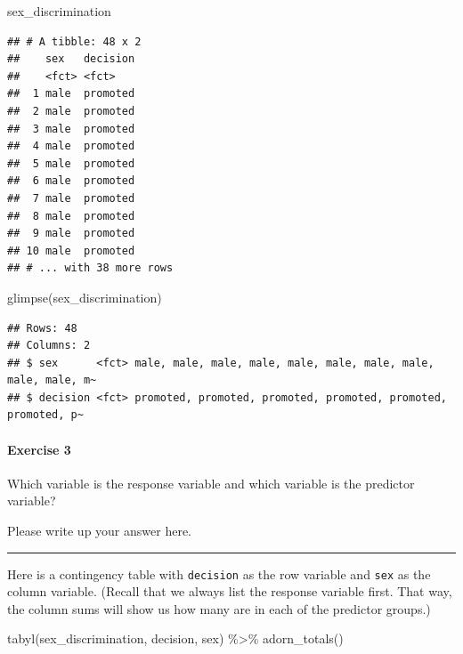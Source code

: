 \documentclass[
]{book}
\newenvironment{Shaded}{\begin{snugshade}}{\end{snugshade}}
\newcommand{\FunctionTok}[1]{\textcolor[rgb]{0.00,0.00,0.00}{#1}}
\newcommand{\NormalTok}[1]{#1}
\newcommand{\SpecialCharTok}[1]{\textcolor[rgb]{0.00,0.00,0.00}{#1}}
\begin{document}
\begin{Shaded}
\begin{Highlighting}[]
\NormalTok{sex\_discrimination}
\end{Highlighting}
\end{Shaded}

\begin{verbatim}
## # A tibble: 48 x 2
##    sex   decision
##    <fct> <fct>   
##  1 male  promoted
##  2 male  promoted
##  3 male  promoted
##  4 male  promoted
##  5 male  promoted
##  6 male  promoted
##  7 male  promoted
##  8 male  promoted
##  9 male  promoted
## 10 male  promoted
## # ... with 38 more rows
\end{verbatim}

\begin{Shaded}
\begin{Highlighting}[]
\FunctionTok{glimpse}\NormalTok{(sex\_discrimination)}
\end{Highlighting}
\end{Shaded}

\begin{verbatim}
## Rows: 48
## Columns: 2
## $ sex      <fct> male, male, male, male, male, male, male, male, male, male, m~
## $ decision <fct> promoted, promoted, promoted, promoted, promoted, promoted, p~
\end{verbatim}

\hypertarget{exercise-3-5}{%
\paragraph*{Exercise 3}\label{exercise-3-5}}

Which variable is the response variable and which variable is the predictor variable?

Please write up your answer here.

\begin{center}\rule{0.5\linewidth}{0.5pt}\end{center}

Here is a contingency table with \texttt{decision} as the row variable and \texttt{sex} as the column variable. (Recall that we always list the response variable first. That way, the column sums will show us how many are in each of the predictor groups.)

\begin{Shaded}
\begin{Highlighting}[]
\FunctionTok{tabyl}\NormalTok{(sex\_discrimination, decision, sex) }\SpecialCharTok{\%\textgreater{}\%}
    \FunctionTok{adorn\_totals}\NormalTok{()}
\end{Highlighting}
\end{Shaded}
\end{document}
